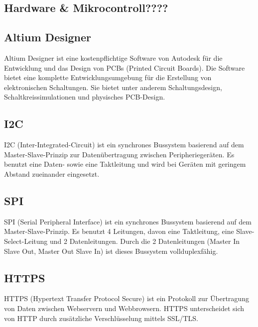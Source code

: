 \begin{inhalt}
\renewcommand*\chapterpagestyle{scrheadings}
 \section{Hardware \& Mikrocontroll????}
 
\subsection{Altium Designer}

Altium Designer ist eine kostenpflichtige Software von Autodesk für die Entwicklung und das Design von PCBs (Printed Circuit Boards). Die Software bietet eine komplette Entwicklungsumgebung für die Erstellung von elektronischen Schaltungen. Sie bietet unter anderem Schaltungsdesign, Schaltkreissimulationen und physisches PCB-Design. 
 \cite{AltiumDesignerWiki}

\subsection{I2C}

I2C (Inter-Integrated-Circuit) ist ein synchrones Bussystem basierend auf dem Master-Slave-Prinzip zur Datenübertragung zwischen Peripheriegeräten. Es benutzt eine Daten- sowie eine Taktleitung und wird bei Geräten mit geringem Abstand zueinander eingesetzt. 
 \cite{I2C_Kommunkation}

\subsection{SPI}

SPI (Serial Peripheral Interface) ist ein synchrones Bussystem basierend auf dem Master-Slave-Prinzip. Es benutzt 4 Leitungen, davon eine Taktleitung, eine Slave-Select-Leitung und 2 Datenleitungen. Durch die 2 Datenleitungen (Master In Slave Out, Master Out Slave In) ist dieses Bussystem vollduplexfähig. \cite{SPI_Kommunikation}

\subsection{HTTPS}

HTTPS (Hypertext Transfer Protocol Secure) ist ein Protokoll zur Übertragung von Daten zwischen Webservern und Webbrowsern. HTTPS unterscheidet sich von HTTP durch zusätzliche Verschlüsselung mittels SSL/TLS. \cite{HTTPS_Kommunkation}


\end{inhalt}
